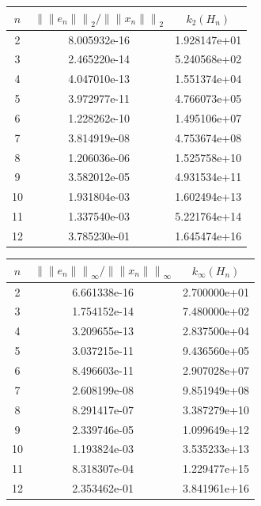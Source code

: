 \documentclass{article}
\begin{document}
\begin{tabularx}{400pt}{c|c|c}
 $n$ & ${\|\|e_n\|\|}_2 / {\|\|x_n\|\|}_2$ & $k_2(H_n)$ \\
\hline
 2 & 8.005932e-16 & 1.928147e+01 \\
 \hline 
 3 & 2.465220e-14 & 5.240568e+02 \\
 \hline 
 4 & 4.047010e-13 & 1.551374e+04 \\
 \hline 
 5 & 3.972977e-11 & 4.766073e+05 \\
 \hline 
 6 & 1.228262e-10 & 1.495106e+07 \\
 \hline 
 7 & 3.814919e-08 & 4.753674e+08 \\
 \hline 
 8 & 1.206036e-06 & 1.525758e+10 \\
 \hline 
 9 & 3.582012e-05 & 4.931534e+11 \\
 \hline 
10 & 1.931804e-03 & 1.602494e+13 \\
 \hline 
11 & 1.337540e-03 & 5.221764e+14 \\
 \hline 
12 & 3.785230e-01 & 1.645474e+16 \\
 \hline 
\end{tabularx}
\begin{tabularx}{400pt}{c|c|c}
 $n$ & ${\|\|e_n\|\|}_\infty / {\|\|x_n\|\|}_\infty$ & $k_\infty(H_n)$ \\
\hline
 2 & 6.661338e-16 & 2.700000e+01 \\ 
 \hline 
 3 & 1.754152e-14 & 7.480000e+02 \\ 
 \hline 
 4 & 3.209655e-13 & 2.837500e+04 \\ 
 \hline 
 5 & 3.037215e-11 & 9.436560e+05 \\ 
 \hline 
 6 & 8.496603e-11 & 2.907028e+07 \\ 
 \hline 
 7 & 2.608199e-08 & 9.851949e+08 \\ 
 \hline 
 8 & 8.291417e-07 & 3.387279e+10 \\ 
 \hline 
 9 & 2.339746e-05 & 1.099649e+12 \\ 
 \hline 
10 & 1.193824e-03 & 3.535233e+13 \\ 
 \hline 
11 & 8.318307e-04 & 1.229477e+15 \\ 
 \hline 
12 & 2.353462e-01 & 3.841961e+16 \\ 
 \hline 
\end{tabularx}
\end{document}
